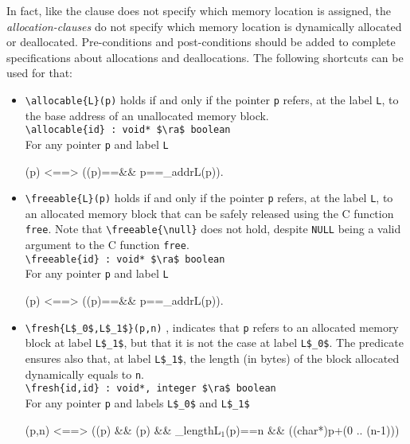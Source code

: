 In fact, like the \assigns clause does not specify which memory location is
assigned,
the \textsl{allocation-clauses} do not specify which memory location 
is dynamically allocated or deallocated.
Pre-conditions and post-conditions should be added to complete specifications
about allocations and deallocations.
The following shortcuts can be used for that:

\begin{itemize}
\item \lstinline|\allocable{L}(p)|
holds if and only if
the pointer \lstinline|p| refers, at the label \lstinline|L|, 
to the base address of 
an unallocated memory block.
\\ \makebox[5mm]{} \lstinline|\allocable{id} : void* $\ra$ boolean|
\\
For any pointer \lstinline|p| and label \lstinline|L|
\begin{listing-nonumber}
(p) <==> ((p)==\unallocated && p==\base_addr{L}(p)).
\end{listing-nonumber}
  
\item \lstinline|\freeable{L}(p)|
holds if and only if
the pointer \lstinline|p| refers, at the label \lstinline|L|, 
to an allocated memory block 
that can be safely released using the C function \lstinline|free|.
Note that \lstinline|\freeable{\null}| does not hold, despite \lstinline|NULL|
being a valid argument to the C function \lstinline|free|.
\\ \makebox[5mm]{} \lstinline|\freeable{id} : void* $\ra$ boolean|
\\
For any pointer \lstinline|p| and label \lstinline|L|
\begin{listing-nonumber}
(p) <==> ((p)==\dynamic && p==\base_addr{L}(p)).
\end{listing-nonumber}
  
\item \lstinline|\fresh{L$_0$,L$_1$}(p,n)|
,
  indicates that \lstinline|p| refers to an allocated memory block at label 
  \lstinline|L$_1$|, 
  but that it is not the case at label \lstinline|L$_0$|. 
  The predicate ensures also that, at label \lstinline|L$_1$|, the length
  (in bytes) of the block allocated dynamically equals to \lstinline|n|.
\\ \makebox[5mm]{} \lstinline|\fresh{id,id} : void*, integer $\ra$ boolean|
\\
For any pointer \lstinline|p| and labels \lstinline|L$_0$| and \lstinline|L$_1$|
\begin{listing-nonumber}
(p,n) <==> ((p) && 
                         (p) && 
                         \block_length{L$_1$}(p)==n &&
                         ((char*)p+(0 .. (n-1)))
\end{listing-nonumber}
\end{itemize}

